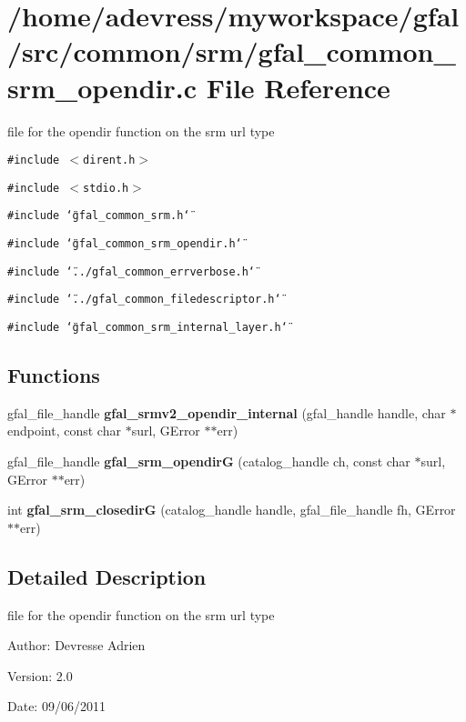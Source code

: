 \section{/home/adevress/myworkspace/gfal/src/common/srm/gfal\_\-common\_\-srm\_\-opendir.c File Reference}
\label{gfal__common__srm__opendir_8c}
file for the opendir function on the srm url type 

{\tt \#include $<$dirent.h$>$}\par
{\tt \#include $<$stdio.h$>$}\par
{\tt \#include \char`\"{}gfal\_\-common\_\-srm.h\char`\"{}}\par
{\tt \#include \char`\"{}gfal\_\-common\_\-srm\_\-opendir.h\char`\"{}}\par
{\tt \#include \char`\"{}../gfal\_\-common\_\-errverbose.h\char`\"{}}\par
{\tt \#include \char`\"{}../gfal\_\-common\_\-filedescriptor.h\char`\"{}}\par
{\tt \#include \char`\"{}gfal\_\-common\_\-srm\_\-internal\_\-layer.h\char`\"{}}\par
\subsection*{Functions}
\begin{CompactItemize}
\item 
gfal\_\-file\_\-handle \textbf{gfal\_\-srmv2\_\-opendir\_\-internal} (gfal\_\-handle handle, char $\ast$endpoint, const char $\ast$surl, GError $\ast$$\ast$err)\label{gfal__common__srm__opendir_8c_58227a1ecd5a6d7095f5e5ef18e1973e}

\item 
gfal\_\-file\_\-handle \textbf{gfal\_\-srm\_\-opendir\-G} (catalog\_\-handle ch, const char $\ast$surl, GError $\ast$$\ast$err)\label{gfal__common__srm__opendir_8c_98735cc394e8308aff0d47bb13fda64f}

\item 
int \textbf{gfal\_\-srm\_\-closedir\-G} (catalog\_\-handle handle, gfal\_\-file\_\-handle fh, GError $\ast$$\ast$err)\label{gfal__common__srm__opendir_8c_a9f63a5ff1be26668963f98f2fba9733}

\end{CompactItemize}


\subsection{Detailed Description}
file for the opendir function on the srm url type 

\begin{Desc}
\item[Author:]Devresse Adrien \end{Desc}
\begin{Desc}
\item[Version:]2.0 \end{Desc}
\begin{Desc}
\item[Date:]09/06/2011 \end{Desc}
